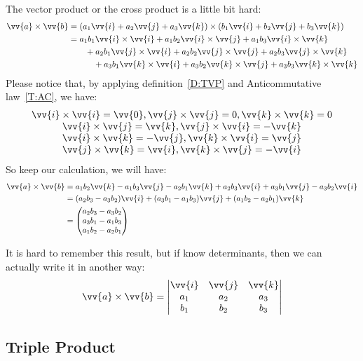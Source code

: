 \documentclass[12pt, a4paper, reqno]{amsart}
\theoremstyle{definition}
\numberwithin{equation}{section} %
\begin{document}
The vector product or the cross product is a little bit hard:
\begin{align*}
	\vv{a}\times \vv{b} &= (a_1 \vv{i} + a_2 \vv{j} + a_3 \vv{k}) \times (b_1 \vv{i} + b_2\vv{j} + b_3\vv{k})\\
	                    &= a_1b_1 \vv{i}\times\vv{i} + a_1b_2 \vv{i}\times\vv{j} + a_1b_3 \vv{i}\times\vv{k}\\
	                    &\qquad +a_2b_1 \vv{j}\times\vv{i} + a_2b_2 \vv{j}\times\vv{j} + a_2b_3 \vv{j}\times\vv{k}\\
	                    &\qquad\quad +a_3b_1 \vv{k}\times\vv{i} + a_3b_2 \vv{k}\times\vv{j} + a_3b_3 \vv{k}\times\vv{k}
\end{align*}
Please notice that, by applying definition~\ref{D:TVP} and Anticommutative law~\ref{T:AC}, we have:
\[
\begin{array}{c}
	\vv{i}\times\vv{i} = \vv{0}, \vv{j}\times\vv{j} = 0, \vv{k}\times\vv{k} = 0\\
	\vv{i}\times\vv{j} = \vv{k}, \vv{j}\times\vv{i} = -\vv{k}\\
	\vv{i}\times\vv{k} = -\vv{j}, \vv{k}\times\vv{i} = \vv{j}\\
	\vv{j}\times\vv{k} = \vv{i}, \vv{k}\times\vv{j} = -\vv{i}
\end{array}
\]
So keep our calculation, we will have:
\begin{align*}
	\vv{a}\times \vv{b} &= a_1b_2 \vv{k} - a_1b_3\vv{j} - a_2b_1\vv{k} + a_2b_3\vv{i} +a_3b_1\vv{j} - a_3b_2\vv{i}\\
	&=(a_2b_3-a_3b_2)\vv{i} + (a_3b_1-a_1b_3)\vv{j} + (a_1b_2-a_2b_1)\vv{k}\\
	&=
	\begin{pmatrix}
		a_2b_3-a_3b_2	\\
		a_3b_1-a_1b_3 \\
		a_1b_2-a_2b_1
	\end{pmatrix}
\end{align*}

It is hard to remember this result, but if know determinants, then we can actually write it in another way:
\begin{equation}
	\vv{a}\times \vv{b} =
	\begin{vmatrix}
		\vv{i} &\vv{j} &\vv{k}\\
		a_1 & a_2 & a_3\\
		b_1 & b_2 & b_3
	\end{vmatrix}
\end{equation}


\subsection{Triple Product}\label{SS:CTP}\hfill
\end{document}

